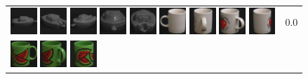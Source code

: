 {\begin{figure}[p]
\begin{tabular}{m{11cm} | m{3cm} |}
\includegraphics[width=1cm]{coil/beeld-25.eps}
\includegraphics[width=1cm]{coil/beeld-28.eps}
\includegraphics[width=1cm]{coil/beeld-27.eps}
\includegraphics[width=1cm]{coil/beeld-26.eps}
\includegraphics[width=1cm]{coil/beeld-29.eps}
\includegraphics[width=1cm]{coil/beeld-37.eps}
\includegraphics[width=1cm]{coil/beeld-41.eps}
\includegraphics[width=1cm]{coil/beeld-40.eps}
\includegraphics[width=1cm]{coil/beeld-38.eps}
& {\scriptsize 0.0}
\\
\includegraphics[width=1cm]{coil/beeld-30.eps}
\includegraphics[width=1cm]{coil/beeld-34.eps}
\includegraphics[width=1cm]{coil/beeld-32.eps}

\end{tabular}
\end{figure}}
